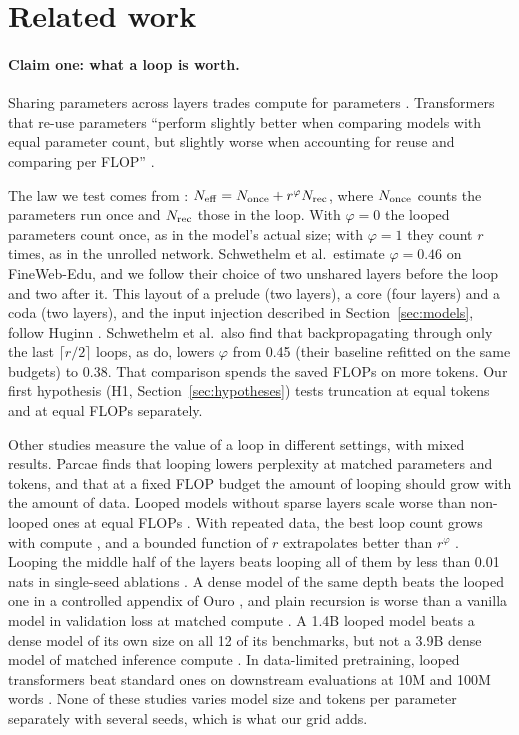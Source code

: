 \section{Related work}
\label{sec:related}

\paragraph{Claim one: what a loop is worth.}
Sharing parameters across layers trades compute for parameters \citep{dehghani2019universal,lan2019albert,bae2025relaxed}.
Transformers that re-use parameters ``perform slightly better when comparing models with equal parameter count, but
slightly worse when accounting for reuse and comparing per FLOP'' \citep[App.~D.2, Fig.~17]{kaplan2020scaling}.

The law we test comes from \citet{schwethelm2026how}: $N_{\mathrm{eff}} = N_{\mathrm{once}} + r^{\varphi}N_{\mathrm{rec}}$, where $N_{\mathrm{once}}$ counts the
parameters run once and $N_{\mathrm{rec}}$ those in the loop. With $\varphi = 0$ the looped parameters count once, as in the
model's actual size; with $\varphi = 1$ they count $r$ times, as in the unrolled network. Schwethelm et al.\ estimate
$\varphi = 0.46$ on FineWeb-Edu, and we follow their choice of two unshared layers before the loop and two after it.
This layout of a prelude (two layers), a core (four layers) and a coda (two layers), and the input injection described
in Section~\ref{sec:models}, follow Huginn \citep{geiping2025scaling}. Schwethelm et al.\ also find that backpropagating
through only the last $\lceil r/2 \rceil$ loops, as \citet{prairie2026parcae} do, lowers $\varphi$ from 0.45 (their
baseline refitted on the same budgets) to 0.38. That comparison spends the saved FLOPs on more tokens. Our first
hypothesis (H1, Section~\ref{sec:hypotheses}) tests truncation at equal tokens and at equal FLOPs separately.

Other studies measure the value of a loop in different settings, with mixed results. Parcae \citep{prairie2026parcae}
finds that looping lowers perplexity at matched parameters and tokens, and that at a fixed FLOP budget the amount of looping
should grow with the amount of data. Looped models without sparse layers scale worse than non-looped ones at equal FLOPs
\citep{lee2026sparse}. With repeated data, the best loop count grows with compute \citep{chen2026growth}, and a bounded
function of $r$ extrapolates better than $r^{\varphi}$ \citep{chen2026moe}. Looping the middle half of the layers beats looping all
of them by less than 0.01 nats in single-seed ablations \citep{wang2026smelt}. A dense model of the same depth beats the
looped one in a controlled appendix of Ouro \citep{zhu2025scaling}, and plain recursion is worse than a vanilla model in
validation loss at matched compute \citep{bae2025mixture}. A 1.4B looped model beats a dense model of its own size on all
12 of its benchmarks, but not a 3.9B dense model of matched inference compute \citep{marchenko2026closing}. In
data-limited pretraining, looped transformers beat standard ones on downstream evaluations at 10M and 100M words
\citep{gulbahar2026squeezing}. None of these studies varies model size and tokens per parameter separately with several
seeds, which is what our grid adds.

